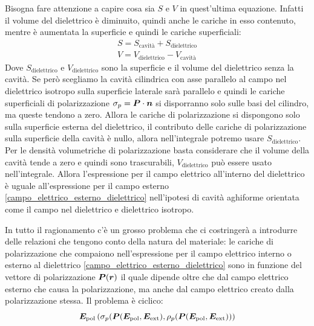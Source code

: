 Bisogna fare attenzione a capire cosa sia $S$ e $V$ in quest'ultima equazione. Infatti il volume del dielettrico è diminuito, quindi anche le cariche in esso contenuto, mentre è aumentata la superficie e quindi le cariche superficiali:
\begin{subequations}
  \begin{gather}
    S=S_\text{cavità} +S_\text{dielettrico}\\
    V=V_\text{dielettrico}-V_\text{cavità}
  \end{gather}
\end{subequations}
Dove $S_\text{dielettrico}$ e $V_\text{dielettrico}$ sono la superficie e il volume del dielettrico senza la cavità. Se però scegliamo la cavità cilindrica con asse parallelo al campo nel dielettrico isotropo sulla superficie laterale sarà parallelo e quindi le cariche superficiali di polarizzazione $\sigma_p=\boldsymbol{P}\cdot\boldsymbol{n}$ si disporranno solo sulle basi del cilindro, ma queste tendono a zero. Allora le cariche di polarizzazione si dispongono solo sulla superficie esterna del dielettrico, il contributo delle cariche di polarizzazione sulla superficie della cavità è nullo, allora nell'integrale potremo usare $S_\text{dielettrico}$. Per le densità volumetriche di polarizzazione basta considerare che il volume della cavità tende a zero e quindi sono trascurabili, $V_\text{dielettrico}$ può essere usato nell'integrale. Allora l'espressione per il campo elettrico all'interno del dielettrico è uguale all'espressione per il campo esterno \eqref{campo_elettrico_esterno_dielettrico} nell'ipotesi di cavità aghiforme orientata come il campo nel dielettrico e dielettrico isotropo.

In tutto il ragionamento c'è un grosso problema che ci costringerà a introdurre delle relazioni che tengono conto della natura del materiale: le cariche di polarizzazione che compaiono nell'espressione per il campo elettrico interno o esterno al dielettrico \eqref{campo_elettrico_esterno_dielettrico} sono in funzione del vettore di polarizzazione $\boldsymbol{P}(\boldsymbol{r})$ il quale dipende oltre che dal campo elettrico esterno che causa la polarizzazione, ma anche dal campo elettrico creato dalla polarizzazione stessa. Il problema è ciclico:
\[
  \boldsymbol{E}_\text{pol}\left(\sigma_p(\boldsymbol{P}(\boldsymbol{E}_\text{pol},\boldsymbol{E}_\text{ext}),\rho_p(\boldsymbol{P}(\boldsymbol{E}_\text{pol},\boldsymbol{E}_\text{ext}))\right)
\]

